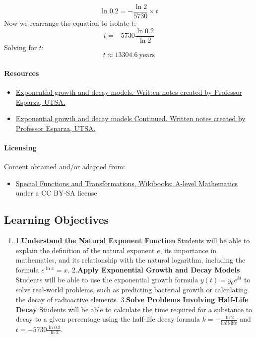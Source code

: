 $$
\ln 0.2 = -\frac{\ln 2}{5730} \times t
$$
Now we rearrange the equation to isolate $t$:
$$
t = -5730 \frac{\ln 0.2}{\ln 2}
$$
Solving for $t$:
$$
t \approx 13304.6\ \text{years}
$$
\paragraph{Resources}



\begin{itemize}
    \item \href{https://mathresearch.utsa.edu/wikiFiles/MAT1093/Exponential\%20growth\%20and\%20decay\%20models/Esparza\%201093\%20Notes\%207.6.pdf}{Exponential growth and decay models. Written notes created by Professor Esparza, UTSA.}
    \item \href{https://mathresearch.utsa.edu/wikiFiles/MAT1093/Exponential\%20growth\%20and\%20decay\%20models/Esparza\%201093\%20Notes\%207.6B.pdf}{Exponential growth and decay models Continued. Written notes created by Professor Esparza, UTSA.}
\end{itemize}

\paragraph{Licensing}



Content obtained and/or adapted from:



\begin{itemize}
    \item \href{https://en.wikibooks.org/wiki/A-level_Mathematics/OCR/C3/Special_Functions_and_Transformations}{Special Functions and Transformations, Wikibooks: A-level Mathematics} under a CC BY-SA license
\end{itemize}

\subsection{Learning Objectives}

\begin{enumerate}
    \item 1.\textbf{Understand the Natural Exponent Function} Students will be able to explain the definition of the natural exponent $e$, its importance in mathematics, and its relationship with the natural logarithm, including the formula $e^{\ln x} = x$. 2.\textbf{Apply Exponential Growth and Decay Models} Students will be able to use the exponential growth formula $y(t) = y_0 e^{kt}$ to solve real-world problems, such as predicting bacterial growth or calculating the decay of radioactive elements. 3.\textbf{Solve Problems Involving Half-Life Decay} Students will be able to calculate the time required for a substance to decay to a given percentage using the half-life decay formula $k = -\frac{\ln 2}{\text{half-life}}$ and $t = -5730 \frac{\ln 0.2}{\ln 2}$.
\end{enumerate}

